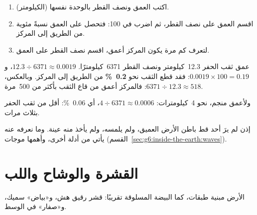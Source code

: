 \begin{method}\label{met:g6:inside-the-earth:percent}
\begin{enumerate}
  \item اكتب العمق ونصف القطر بالوحدة نفسها (الكيلومتر).
  \item اقسم العمق على نصف القطر، ثم اضرب في 100: فتحصل على
        العمق نسبةً مئوية من الطريق إلى المركز.
  \item لتعرف كم مرة يكون المركز أعمق، اقسم نصف القطر على
        العمق.
\end{enumerate}
\end{method}

\begin{example}\label{ex:g6:inside-the-earth:kola}
عمق ثقب الحفر 12.3~كيلومتر ونصف القطر 6371~كيلومترًا.
$12.3 \div 6371 \approx 0.0019$، و$0.0019 \times 100 = 0.19$: فقد
قطع الثقب نحو \textbf{0.2~\%} من الطريق إلى المركز. وبالعكس،
$6371 \div 12.3 \approx 518$: فالمركز أعمق من قاع الثقب بأكثر من
500~مرة.

ولأعمق منجم، نحو 4~كيلومترات: $4 \div 6371 \approx 0.0006$، أي
0.06~\%: أقل من ثقب الحفر بثلاث مرات.
\end{example}

إذن لم يرَ أحد قط باطن الأرض العميق، ولم يلمسه، ولم يأخذ منه عينة.
وما نعرفه عنه يأتي من أدلة أخرى، وأهمها موجات
 (القسم~\ref{sec:g6:inside-the-earth:waves}).

\section{القشرة والوشاح واللب}

الأرض مبنية طبقات، كما البيضة المسلوقة تقريبًا: قشر رقيق هش،
و«بياض» سميك، و«صفار» في الوسط.

